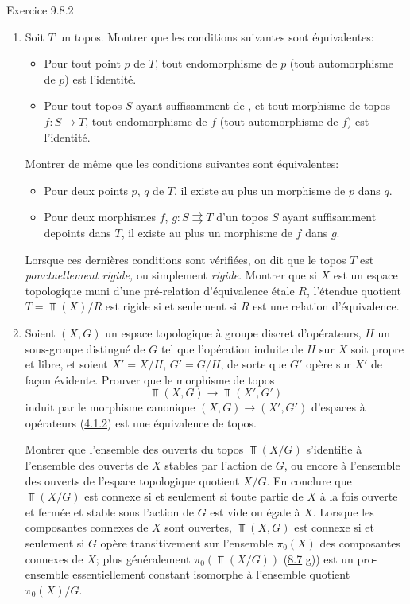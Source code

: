 \documentclass[10pt]{../fichiers-configuration-latex/smfart}
\begin{document}
\begin{enonce*}[remark]{Exercice 9.8.2}
\begin{enumerate}
\item Soit $T$ un topos. Montrer que les conditions suivantes sont
équivalentes:
\begin{itemize}
\item[i)] Pour tout point $p$ de $T$, tout endomorphisme de $p$
(\resp tout automorphisme de $p$) est l'identité.

\item[ii)] Pour tout topos $S$ ayant suffisamment de , et tout
morphisme de topos $f:S\rightarrow T$, tout endomorphisme de $f$
(\resp tout automorphisme de $f$) est l'identité.
\end{itemize}
Montrer de même que les conditions suivantes sont équivalentes:
\begin{itemize}
\item[${\rm i')}$] Pour deux points $p$, $q$ de $T$, il existe au
plus un morphisme de $p$ dans $q$.

\item[${\rm ii')}$] Pour deux morphismes $f$, $g:S\rightrightarrows
T$ d'un topos $S$ ayant suffisamment de\pageoriginale points dans
$T$, il existe au plus un morphisme de $f$ dans $g$.
\end{itemize}

Lorsque ces dernières conditions sont vérifiées, on dit que le topos
$T$ est \emph{ponctuellement rigide,} ou simplement \emph{rigide}.
Montrer que si $X$ est un espace topologique muni d'une pré-relation
d'équivalence étale $R$, l'étendue quotient $T=\Top(X)/R$ est rigide
si et seulement si $R$ est une relation d'équivalence.

\item Soient $(X,G)$ un espace topologique à groupe discret d'opérateurs,
$H$ un sous-groupe distingué de $G$ tel que l'opération induite de
$H$ sur $X$ soit propre et libre, et soient $X'=X/H$, $G'=G/H$, de
sorte que $G'$ opère sur $X'$ de façon évidente. Prouver que le
morphisme de topos
$$
\Top(X,G)\longrightarrow \Top(X',G')
$$
induit par le morphisme canonique $(X,G)\rightarrow (X',G')$
d'espaces à opérateurs (\hyperref[IV.subsubsec4.1.2]{4.1.2}) est une équivalence
de topos.

Montrer que l'ensemble des ouverts du topos $\Top(X/G)$ s'identifie
à l'ensemble des ouverts de $X$ stables par l'action de $G$, ou
encore à l'ensemble des ouverts de l'espace topologique quotient
$X/G$. En conclure que $\Top(X/G)$ est connexe si et seulement si
toute partie de $X$ à la fois ouverte et fermée et stable sous
l'action de $G$ est vide ou égale à $X$. Lorsque les composantes
connexes de $X$ sont ouvertes, $\Top(X,G)$ est connexe si et
seulement si $G$ opère transitivement sur l'ensemble $\pi_0(X)$ des
composantes connexes de $X$; plus généralement $\pi_0(\Top(X/G))$
(\hyperref[IV.exer8.7]{8.7} g)) est un pro-ensemble essentiellement constant
isomorphe à l'ensemble quotient $\pi_0(X)/G$.


\end{enumerate}
\end{enonce*}
\end{document}
